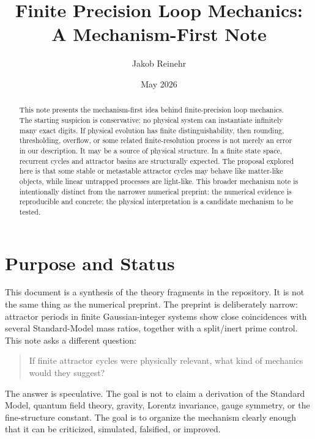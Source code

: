 \documentclass[11pt,a4paper]{article}
\title{Finite Precision Loop Mechanics:\\A Mechanism-First Note}
\author{Jakob Reinehr}
\date{May 2026}
\begin{document}
\maketitle

\begin{abstract}
This note presents the mechanism-first idea behind finite-precision loop
mechanics. The starting suspicion is conservative: no physical system can
instantiate infinitely many exact digits. If physical evolution has finite
distinguishability, then rounding, thresholding, overflow, or some related
finite-resolution process is not merely an error in our description. It may
be a source of physical structure. In a finite state space, recurrent cycles
and attractor basins are structurally expected. The proposal explored here is
that some stable or metastable attractor cycles may behave like matter-like
objects, while linear untrapped processes are light-like. This broader
mechanism note is intentionally distinct from the narrower numerical
preprint: the numerical evidence is reproducible and concrete; the physical
interpretation is a candidate mechanism to be tested.
\end{abstract}

\tableofcontents
\newpage

\section{Purpose and Status}

This document is a synthesis of the theory fragments in the repository. It is
not the same thing as the numerical preprint. The preprint is deliberately
narrow: attractor periods in finite Gaussian-integer systems show close
coincidences with several Standard-Model mass ratios, together with a
split/inert prime control. This note asks a different question:

\begin{quote}
If finite attractor cycles were physically relevant, what kind of mechanics
would they suggest?
\end{quote}

The answer is speculative. The goal is not to claim a derivation of the
Standard Model, quantum field theory, gravity, Lorentz invariance, gauge
symmetry, or the fine-structure constant. The goal is to organize the
mechanism clearly enough that it can be criticized, simulated, falsified, or
improved.
\end{document}
